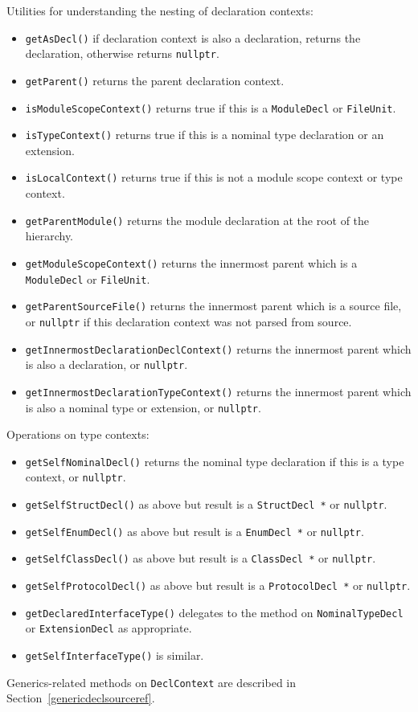 \documentclass[a4paper,headsepline,bibliography=totoc,toc=flat,fleqn,twoside=semi]{scrbook}
\theoremstyle{definition}
\theoremstyle{definition}
\theoremstyle{definition}
\begin{document}
Utilities for understanding the nesting of declaration contexts:
\begin{itemize}
\item \texttt{getAsDecl()} if declaration context is also a declaration, returns the declaration, otherwise returns \texttt{nullptr}.
\item \texttt{getParent()} returns the parent declaration context.
\item \texttt{isModuleScopeContext()} returns true if this is a \texttt{ModuleDecl} or \texttt{FileUnit}.
\item \texttt{isTypeContext()} returns true if this is a nominal type declaration or an extension.
\item \texttt{isLocalContext()} returns true if this is not a module scope context or type context.
\item \texttt{getParentModule()} returns the module declaration at the root of the hierarchy.
\item \texttt{getModuleScopeContext()} returns the innermost parent which is a \texttt{ModuleDecl} or \texttt{FileUnit}.
\item \texttt{getParentSourceFile()} returns the innermost parent which is a source file, or \texttt{nullptr} if this declaration context was not parsed from source.
\item \texttt{getInnermostDeclarationDeclContext()} returns the innermost parent which is also a declaration, or \texttt{nullptr}.
\item \texttt{getInnermostDeclarationTypeContext()} returns the innermost parent which is also a nominal type or extension, or \texttt{nullptr}.
\end{itemize}
Operations on type contexts:
\begin{itemize}
\item \texttt{getSelfNominalDecl()} returns the nominal type declaration if this is a type context, or \texttt{nullptr}.
\item \texttt{getSelfStructDecl()} as above but result is a \texttt{StructDecl *} or \texttt{nullptr}.
\item \texttt{getSelfEnumDecl()} as above but result is a \texttt{EnumDecl *} or \texttt{nullptr}.
\item \texttt{getSelfClassDecl()} as above but result is a \texttt{ClassDecl *} or \texttt{nullptr}.
\item \texttt{getSelfProtocolDecl()} as above but result is a \texttt{ProtocolDecl *} or \texttt{nullptr}.
\item \texttt{getDeclaredInterfaceType()} delegates to the method on \texttt{NominalTypeDecl} or \texttt{ExtensionDecl} as appropriate.
\item \texttt{getSelfInterfaceType()} is similar.
\end{itemize}
Generics-related methods on \texttt{DeclContext} are described in Section~\ref{genericdeclsourceref}.
\end{document}
